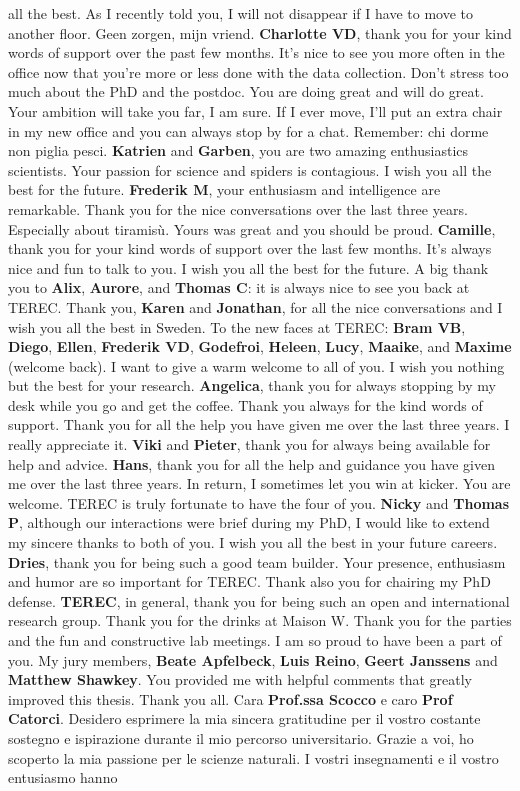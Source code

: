 \documentclass[10pt, twoside]{book} %
\begin{document}
all the best. As I recently told you, I will not disappear if I have to move to another floor. Geen zorgen, mijn vriend. \textbf{Charlotte VD}, thank you for your kind words of support over the past few months. It's nice to see you more often in the office now that you're more or less done with the data collection. Don't stress too much about the PhD and the postdoc. You are doing great and will do great. Your ambition will take you far, I am sure. If I ever move, I'll put an extra chair in my new office and you can always stop by for a chat. Remember: chi dorme non piglia pesci. \textbf{Katrien} and \textbf{Garben}, you are two amazing enthusiastics scientists. Your passion for science and spiders is contagious. I wish you all the best for the future. \textbf{Frederik M}, your enthusiasm and intelligence are remarkable. Thank you for the nice conversations over the last three years. Especially about tiramisù. Yours was great and you should be proud. \textbf{Camille}, thank you for your kind words of support over the last few months. It’s always nice and fun to talk to you. I wish you all the best for the future. A big thank you to \textbf{Alix}, \textbf{Aurore}, and \textbf{Thomas C}: it is always nice to see you back at TEREC. Thank you, \textbf{Karen} and \textbf{Jonathan}, for all the nice conversations and I wish you all the best in Sweden. To the new faces at TEREC: \textbf{Bram VB}, \textbf{Diego}, \textbf{Ellen}, \textbf{Frederik VD}, \textbf{Godefroi}, \textbf{Heleen}, \textbf{Lucy}, \textbf{Maaike}, and \textbf{Maxime} (welcome back). I want to give a warm welcome to all of you. I wish you nothing but the best for your research. \textbf{Angelica}, thank you for always stopping by my desk while you go and get the coffee. Thank you always for the kind words of support. Thank you for all the help you have given me over the last three years. I really appreciate it. \textbf{Viki} and \textbf{Pieter}, thank you for always being available for help and advice. \textbf{Hans}, thank you for all the help and guidance you have given me over the last three years. In return, I sometimes let you win at kicker. You are welcome. TEREC is truly fortunate to have the four of you. \textbf{Nicky} and \textbf{Thomas P}, although our interactions were brief during my PhD, I would like to extend my sincere thanks to both of you. I wish you all the best in your future careers. \textbf{Dries}, thank you for being such a good team builder. Your presence, enthusiasm and humor are so important for TEREC. Thank also you for chairing my PhD defense.  \textbf{TEREC}, in general, thank you for being such an open and international research group. Thank you for the drinks at Maison W. Thank you for the parties and the fun and constructive lab meetings. I am so proud to have been a part of you. My jury members, \textbf{Beate Apfelbeck}, \textbf{Luis Reino}, \textbf{Geert Janssens} and \textbf{Matthew Shawkey}. You provided me with helpful comments that greatly improved this thesis. Thank you all. Cara \textbf{Prof.ssa Scocco} e caro \textbf{Prof Catorci}. Desidero esprimere la mia sincera gratitudine per il vostro costante sostegno e ispirazione durante il mio percorso universitario. Grazie a voi, ho scoperto la mia passione per le scienze naturali. I vostri insegnamenti e il vostro entusiasmo hanno 
\end{document}
